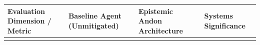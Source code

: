\documentclass[
  10pt,letterpaper]{article}
\begin{document}
\begin{table}[htbp]
\centering
\begin{tabular}{@{}
  >{\raggedright\arraybackslash}p{}
  >{\centering\arraybackslash}p{}
  >{\centering\arraybackslash}p{}
  >{\raggedright\arraybackslash}p{}@{}}
\toprule\noalign{}
\begin{minipage}[b]{\linewidth}\raggedright
Evaluation Dimension / Metric
\end{minipage} & \begin{minipage}[b]{\linewidth}\centering
Baseline Agent (Unmitigated)
\end{minipage} & \begin{minipage}[b]{\linewidth}\centering
Epistemic Andon Architecture
\end{minipage} & \begin{minipage}[b]{\linewidth}\raggedright
Systems Significance
\end{minipage} \\
\midrule\noalign{}

\bottomrule\noalign{}


\end{tabular}
\end{table}
\end{document}
